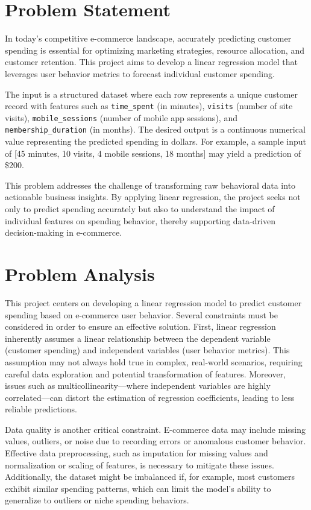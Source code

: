 \documentclass[12pt]{article}
\begin{document}
\section{Problem Statement}
In today’s competitive e-commerce landscape, accurately predicting customer spending is essential for optimizing marketing strategies, resource allocation, and customer retention. This project aims to develop a linear regression model that leverages user behavior metrics to forecast individual customer spending. 

The input is a structured dataset where each row represents a unique customer record with features such as \texttt{time\_spent} (in minutes), \texttt{visits} (number of site visits), \texttt{mobile\_sessions} (number of mobile app sessions), and \texttt{membership\_duration} (in months). The desired output is a continuous numerical value representing the predicted spending in dollars. For example, a sample input of [45 minutes, 10 visits, 4 mobile sessions, 18 months] may yield a prediction of \$200.

This problem addresses the challenge of transforming raw behavioral data into actionable business insights. By applying linear regression, the project seeks not only to predict spending accurately but also to understand the impact of individual features on spending behavior, thereby supporting data-driven decision-making in e-commerce.

\section{Problem Analysis}

This project centers on developing a linear regression model to predict customer spending based on e-commerce user behavior. Several constraints must be considered in order to ensure an effective solution. First, linear regression inherently assumes a linear relationship between the dependent variable (customer spending) and independent variables (user behavior metrics). This assumption may not always hold true in complex, real-world scenarios, requiring careful data exploration and potential transformation of features. Moreover, issues such as multicollinearity—where independent variables are highly correlated—can distort the estimation of regression coefficients, leading to less reliable predictions.


Data quality is another critical constraint. E-commerce data may include missing values, outliers, or noise due to recording errors or anomalous customer behavior. Effective data preprocessing, such as imputation for missing values and normalization or scaling of features, is necessary to mitigate these issues. Additionally, the dataset might be imbalanced if, for example, most customers exhibit similar spending patterns, which can limit the model's ability to generalize to outliers or niche spending behaviors.
\end{document}
